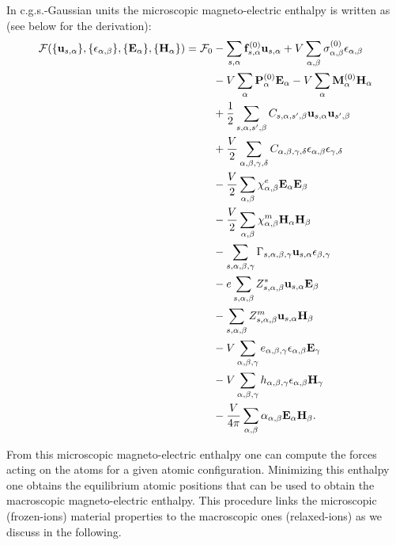 \documentclass[12pt,a4paper]{article}
\begin{document}
\newpage
{\color{orange} In c.g.s.-Gaussian units the microscopic
magneto-electric enthalpy is written as (see below for the derivation):
\begin{align}
\mathcal{F}(\{{\bf u}_{s,\alpha}\}, \{\epsilon_{\alpha,\beta}\},
\{ {\bf E}_\alpha\}, \{{\bf H}_\alpha\})=\mathcal{F}_0 &-
\sum_{s,\alpha} {\bf f}^{(0)}_{s,\alpha} {\bf u}_{s,\alpha}+ 
V \sum_{\alpha,\beta}
\sigma^{(0)}_{\alpha,\beta} \epsilon_{\alpha,\beta} \nonumber \\ 
&- V \sum_{\alpha} {\bf P}^{(0)}_\alpha {\bf E}_\alpha - 
V \sum_{\alpha}
{\bf M}^{(0)}_\alpha {\bf H}_\alpha \nonumber \\
&+ {1\over 2}
\sum_{s,\alpha,s',\beta} C_{s,\alpha,s',\beta} {\bf u}_{s,\alpha}
{\bf u}_{s',\beta}\nonumber \\
&+ {V\over 2}\sum_{\alpha,\beta,\gamma,\delta} 
C_{\alpha,\beta,\gamma,\delta}  
\epsilon_{\alpha,\beta}
\epsilon_{\gamma,\delta} \nonumber \\
&- {V\over 2} \sum_{\alpha,\beta} 
\chi^e_{\alpha,\beta}
{\bf E}_{\alpha}
{\bf E}_{\beta} \nonumber \\
&- {V \over 2}  \sum_{\alpha,\beta} 
\chi^m_{\alpha,\beta}
{\bf H}_{\alpha}
{\bf H}_{\beta} \nonumber \\
&- \sum_{s,\alpha,\beta,\gamma}
\Gamma_{s,\alpha,\beta,\gamma} {\bf u}_{s,\alpha}
\epsilon_{\beta,\gamma}\nonumber \\
&- e\sum_{s,\alpha,\beta} Z^*_{s,\alpha,\beta} 
{\bf u}_{s,\alpha} {\bf E}_{\beta} \nonumber \\
&- \sum_{s,\alpha,\beta} 
Z^m_{s,\alpha,\beta} {\bf u}_{s,\alpha}{\bf H}_{\beta} \nonumber \\
&- V \sum_{\alpha,\beta,\gamma} e_{\alpha,\beta,\gamma} 
\epsilon_{\alpha,\beta} {\bf E}_{\gamma} \nonumber \\
&- V \sum_{\alpha,\beta,\gamma}  h_{\alpha,\beta,\gamma} 
\epsilon_{\alpha,\beta} {\bf H}_{\gamma} \nonumber \\
&- {V \over 4 \pi} \sum_{\alpha,\beta} 
\alpha_{\alpha,\beta} {\bf E}_{\alpha}
{\bf H}_{\beta}.
\end{align}
}

\newpage
From this microscopic magneto-electric enthalpy one can compute the forces
acting on the atoms for a given atomic configuration. Minimizing this
enthalpy one obtains the equilibrium atomic positions that can be used
to obtain the macroscopic magneto-electric enthalpy. This procedure
links the microscopic (frozen-ions) material properties to the
macroscopic ones (relaxed-ions) as we discuss in the following. 
\end{document}
